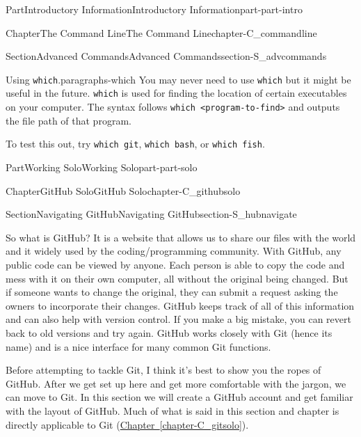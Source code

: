\documentclass[oneside,10pt,]{book}
\newcommand{\xreffont}{\relax}
\newcommand{\mono}[1]{\texttt{#1}}
\begin{document}
\begin{partptx}{Part}{Introductory Information}{}{Introductory Information}{}{}{part-part-intro}
\begin{chapterptx}{Chapter}{The Command Line}{}{The Command Line}{}{}{chapter-C_commandline}
\begin{sectionptx}{Section}{Advanced Commands}{}{Advanced Commands}{}{}{section-S_advcommands}
\begin{paragraphs}{Using \mono{which}.}{paragraphs-which}
%
%
You may never need to use \mono{which} but it might be useful in the future. \mono{which} is used for finding the location of certain executables on your computer. The syntax follows \mono{which <program-to-find>} and outputs the file path of that program.%
\par
To test this out, try \mono{which git}, \mono{which bash}, or \mono{which fish}.%
\end{paragraphs}%
\end{sectionptx}
\end{chapterptx}
\end{partptx}
%
%
\typeout{************************************************}
\typeout{************************************************}
%
\begin{partptx}{Part}{Working Solo}{}{Working Solo}{}{}{part-part-solo}
\renewcommand*{\partname}{Part}
%
\typeout{************************************************}
\typeout{************************************************}
%
\begin{chapterptx}{Chapter}{GitHub Solo}{}{GitHub Solo}{}{}{chapter-C_githubsolo}
\renewcommand*{\chaptername}{Chapter}
%
%
\typeout{************************************************}
\typeout{************************************************}
%
\begin{sectionptx}{Section}{Navigating GitHub}{}{Navigating GitHub}{}{}{section-S_hubnavigate}
%
%
\begin{introduction}{}%
So what is GitHub? It is a website that allows us to share our files with the world and it widely used by the coding\slash{}programming community. With GitHub, any public code can be viewed by anyone. Each person is able to copy the code and mess with it on their own computer, all without the original being changed. But if someone wants to change the original, they can submit a request asking the owners to incorporate their changes. GitHub keeps track of all of this information and can also help with version control. If you make a big mistake, you can revert back to old versions and try again. GitHub works closely with Git (hence its name) and is a nice interface for many common Git functions.%
\par
Before attempting to tackle Git, I think it's best to show you the ropes of GitHub. After we get set up here and get more comfortable with the jargon, we can move to Git. In this section we will create a GitHub account and get familiar with the layout of GitHub. Much of what is said in this section and chapter is directly applicable to Git (\hyperref[chapter-C_gitsolo]{Chapter~{\xreffont\ref{chapter-C_gitsolo}}}).%

\end{introduction}
\end{sectionptx}
\end{chapterptx}
\end{partptx}
\end{document}
